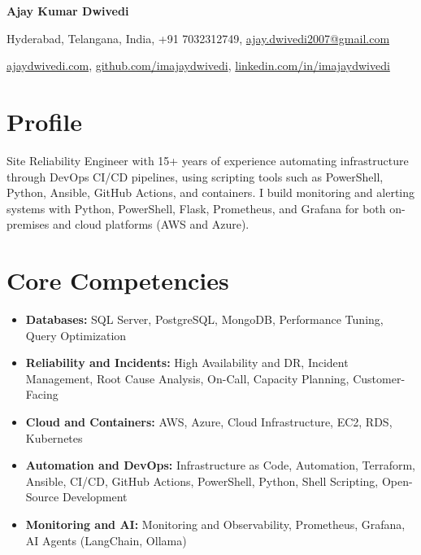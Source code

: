 \documentclass[10pt,a4paper]{article}
\begin{document}
\begin{center}
{\Huge\bfseries Ajay Kumar Dwivedi}

\vspace{6pt}
Hyderabad, Telangana, India, +91 7032312749, \href{mailto:ajay.dwivedi2007@gmail.com}{ajay.dwivedi2007@gmail.com}

\vspace{2pt}
\href{https://ajaydwivedi.com/}{ajaydwivedi.com}, \href{https://github.com/imajaydwivedi}{github.com/imajaydwivedi}, \href{https://linkedin.com/in/imajaydwivedi/}{linkedin.com/in/imajaydwivedi}
\end{center}

\section{Profile}
Site Reliability Engineer with 15+ years of experience automating infrastructure through DevOps CI/CD pipelines, using scripting tools such as PowerShell, Python, Ansible, GitHub Actions, and containers. I build monitoring and alerting systems with Python, PowerShell, Flask, Prometheus, and Grafana for both on-premises and cloud platforms (AWS and Azure).

\section{Core Competencies}
\begin{itemize}
  \item \textbf{Databases:} SQL Server, PostgreSQL, MongoDB, Performance Tuning, Query Optimization
  \item \textbf{Reliability and Incidents:} High Availability and DR, Incident Management, Root Cause Analysis, On-Call, Capacity Planning, Customer-Facing
  \item \textbf{Cloud and Containers:} AWS, Azure, Cloud Infrastructure, EC2, RDS, Kubernetes
  \item \textbf{Automation and DevOps:} Infrastructure as Code, Automation, Terraform, Ansible, CI/CD, GitHub Actions, PowerShell, Python, Shell Scripting, Open-Source Development
  \item \textbf{Monitoring and AI:} Monitoring and Observability, Prometheus, Grafana, AI Agents (LangChain, Ollama)
\end{itemize}
\end{document}
